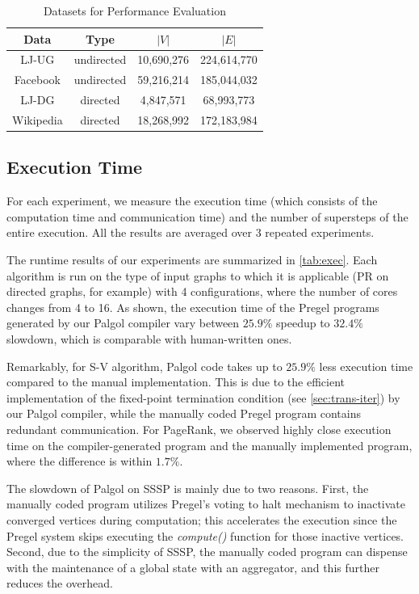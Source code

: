 \documentclass{sokendai_thesis} %
\begin{document}
\begin{table}[t]
 \centering
 \caption{Datasets for Performance Evaluation}
 \label{tab:datasets}
 \begin{tabular}{|c|c|c|c|}
  \hline
  Data & Type & $|V|$ & $|E|$ \\
  \hline\hline
  LJ-UG & undirected & 10,690,276 & 224,614,770 \\
  \hline
  Facebook & undirected & 59,216,214 & 185,044,032 \\
  \hline
  LJ-DG & directed & 4,847,571 & 68,993,773 \\
  \hline
  Wikipedia & directed & 18,268,992 & 172,183,984 \\
  \hline
 \end{tabular}
\vspace{-2ex}\end{table}

\subsection{Execution Time}

For each experiment, we measure the execution time (which consists of the computation time and communication time) and the number of supersteps of the entire execution.
All the results are averaged over 3 repeated experiments.

The runtime results of our experiments are summarized in \autoref{tab:exec}.
Each algorithm is run on the type of input graphs to which it is applicable (PR on directed graphs, for example) with 4 configurations, where the number of cores changes from 4 to 16.
As shown, the execution time of the Pregel programs generated by our Palgol compiler vary between $25.9\%$ speedup to $32.4\%$ slowdown, which is comparable with human-written ones.

Remarkably, for S-V algorithm, Palgol code takes up to $25.9\%$ less execution time compared to the manual implementation.
This is due to the efficient implementation of the fixed-point termination condition (see \autoref{sec:trans-iter}) by our Palgol compiler, while the manually coded Pregel program contains redundant communication.
For PageRank, we observed highly close execution time on the compiler-generated program and the manually implemented program, where the difference is within $1.7\%$.

The slowdown of Palgol on SSSP is mainly due to two reasons.
First, the manually coded program utilizes Pregel's voting to halt mechanism to inactivate converged vertices during computation;  this accelerates the execution since the Pregel system skips executing the \emph{compute()} function for those inactive vertices.
Second, due to the simplicity of SSSP, the manually coded program can dispense with the maintenance of a global state with an aggregator, and this further reduces the overhead.
\end{document}
